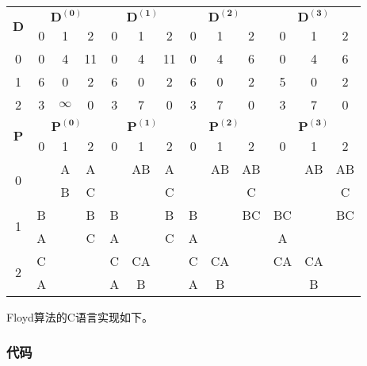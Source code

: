 \begin{center}
\label{tab:floyd}
\begin{tabular}{|c|ccc|ccc|ccc|ccc|}
\hline
\multirow{2}{*}{$\mathbf{D}$} & \multicolumn{3}{|c|}{$\mathbf{D^{(0)}}$} & \multicolumn{3}{|c|}{$\mathbf{D^{(1)}}$} & \multicolumn{3}{|c|}{$\mathbf{D^{(2)}}$} & \multicolumn{3}{|c|}{$\mathbf{D^{(3)}}$} \\
 & 0 & 1 & 2 & 0 & 1 & 2 & 0 & 1 & 2 & 0 & 1 & 2 \\
\hline
0 & 0 & 4 & 11 & 0 & 4 & 11 & 0 & 4 & 6 & 0 & 4 & 6 \\
1 & 6 & 0 & 2 & 6 & 0 & 2 & 6 & 0 & 2 & 5 & 0 & 2 \\
2 & 3 & $\infty$ & 0 & 3 & 7 & 0 & 3 & 7 & 0 & 3 & 7 & 0 \\
\hline
\multirow{2}{*}{$\mathbf{P}$} & \multicolumn{3}{|c|}{$\mathbf{P^{(0)}}$} & \multicolumn{3}{|c|}{$\mathbf{P^{(1)}}$} & \multicolumn{3}{|c|}{$\mathbf{P^{(2)}}$} & \multicolumn{3}{|c|}{$\mathbf{P^{(3)}}$} \\
 & 0 & 1 & 2 & 0 & 1 & 2 & 0 & 1 & 2 & 0 & 1 & 2 \\
\hline
\multirow{2}{*}{0} & & A & A & & AB & A & & AB & AB & & AB & AB \\
                   & & B & C & & & C & & & C & & & C \\
\hline
\multirow{2}{*}{1} & B & & B & B & & B & B & & BC & BC & & BC \\
                   & A & & C & A & & C & A & & & A & & \\
\hline
\multirow{2}{*}{2} & C & & & C & CA & & C & CA & & CA & CA & \\
                   & A & & & A & B & & A & B & & & B & \\
\hline
\end{tabular}
\end{center}

Floyd算法的C语言实现如下。

\subsubsection{代码}

